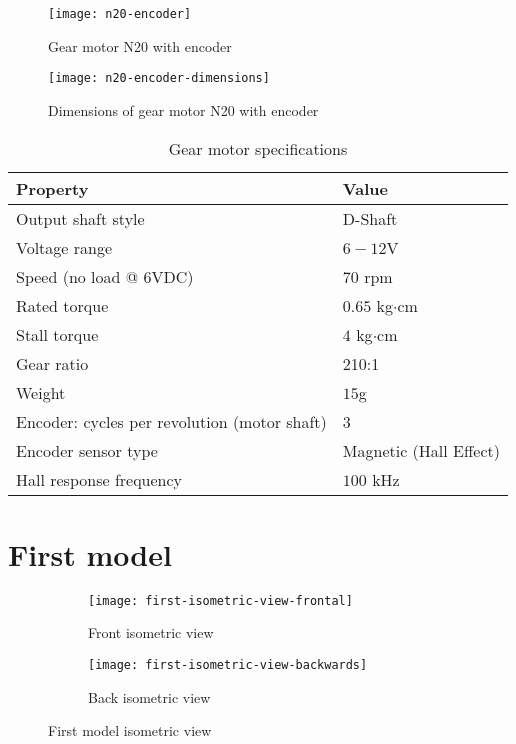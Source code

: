 \begin{figure}
    \centering
    \texttt{[image: n20-encoder]}
    \caption{Gear motor N20 with encoder}
    \label{fig:n20-encoder}
\end{figure}

\begin{figure}
    \centering
    \texttt{[image: n20-encoder-dimensions]}
    \caption{Dimensions of gear motor N20 with encoder}
    \label{fig:n20-encoder-dimensions}
\end{figure}


\begin{table}[]
    \centering
    \caption{Gear motor specifications}
    \label{tab:motor-specs}
    \begin{tabular}{@{}ll@{}}
    \toprule
    Property                                     & Value                  \\
    \midrule
    Output shaft style                           & D-Shaft                \\
    Voltage range                                & $6-12$V                \\
    Speed (no load @ 6VDC)                       & $70$ rpm               \\
    Rated torque                                 & $0.65$ kg$\cdot$cm            \\
    Stall torque                                 & $4$ kg$\cdot$cm               \\
    Gear ratio                                   & 210:1                  \\
    Weight                                       & $15$g                  \\
    Encoder: cycles per revolution (motor shaft) & 3                      \\
    Encoder sensor type                          & Magnetic (Hall Effect) \\
    Hall response frequency                      & $100$ kHz              \\
    \bottomrule
    \end{tabular}
\end{table}

\section{First model}

\begin{figure}
    \centering
    \begin{subfigure}[b]{0.4\textwidth}
        \texttt{[image: first-isometric-view-frontal]}
        \caption{Front isometric view}
        \label{fig:first-front-isometric-view}
    \end{subfigure}
    \begin{subfigure}[b]{0.4\textwidth}
        \texttt{[image: first-isometric-view-backwards]}
        \caption{Back isometric view}
        \label{fig:first-back-isometric-view}
    \end{subfigure}
    \caption{First model isometric view}
    \label{fig:first-isometric-view}
\end{figure}

